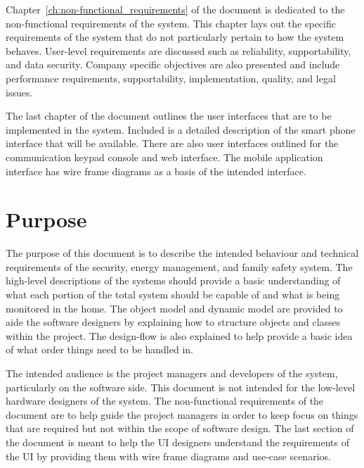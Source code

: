 \documentclass{report}
\begin{document}
Chapter~\ref{ch:non-functional_requirements} of the document is dedicated to
the non-functional requirements of the system. This chapter lays out the
specific requirements of the system that do not particularly pertain to how the
system behaves.  User-level requirements are discussed such as reliability,
supportability, and data security. Company specific objectives are also
presented and include performance requirements, supportability, implementation,
quality, and legal issues.

The last chapter of the document outlines the user interfaces that are to be
implemented in the system. Included is a detailed description of the smart phone
interface that will be available. There are also user interfaces outlined for
the communication keypad console and web interface. The mobile application
interface has wire frame diagrams as a basis of the intended interface.

\section{Purpose}
The purpose of this document is to describe the intended behaviour and
technical requirements of the security, energy management, and family safety
system. The high-level descriptions of the systems should provide a basic
understanding of what each portion of the total system should be capable of and
what is being monitored in the home. The object model and dynamic model are
provided to aide the software designers by explaining how to structure objects
and classes within the project. The design-flow is also explained to help
provide a basic idea of what order things need to be handled in.

The intended audience is the project managers and developers of the
system, particularly on the software side. This document is not intended for
the low-level hardware designers of the system. The non-functional requirements
of the document are to help guide the project managers in order to keep focus
on things that are required but not within the scope of software design. The
last section of the document is meant to help the UI designers understand the
requirements of the UI by providing them with wire frame diagrams and use-case
scenarios.
\end{document}
